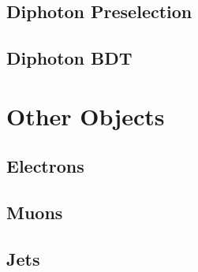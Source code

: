 \subsection{Diphoton Preselection}

\subsection{Diphoton BDT}


\section{Other Objects}

\subsection{Electrons}

\subsection{Muons}

\subsection{Jets}
